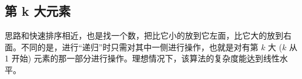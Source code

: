 \subsection{第 k 大元素}
	思路和快速排序相近，也是找一个数，把比它小的放到它左面，比它大的放到右面。不同的是，进行“递归”时只需对其中一侧进行操作，也就是对有第 $k$ 大 ($k$ 从 1 开始) 元素的那一部分进行操作。理想情况下，该算法的复杂度能达到线性水平。
	
	